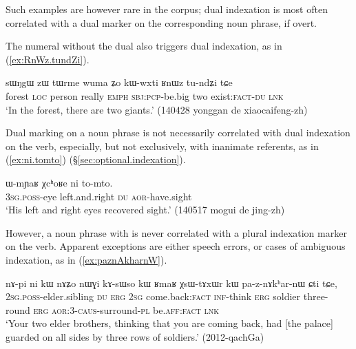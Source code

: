 Such examples are however rare in the corpus; dual indexation is most often correlated with a dual marker on the corresponding noun phrase, if overt.

The numeral  without the dual also triggers dual indexation, as in (\ref{ex:RnWz.tundZi}).

\begin{exe}
\ex \label{ex:RnWz.tundZi}
\gll   sɯŋgɯ zɯ tɯrme wuma ʑo kɯ-wxti ʁnɯz tu-ndʑi tɕe\\
forest \textsc{loc} person really \textsc{emph} \textsc{sbj}:\textsc{pcp}-be.big two exist:\textsc{fact}-\textsc{du} \textsc{lnk}\\
\glt `In the forest, there are two giants.'  (140428 yonggan de xiaocaifeng-zh)
\end{exe}

Dual marking on a noun phrase is not necessarily correlated with dual indexation on the verb, especially, but not exclusively, with inanimate referents, as in (\ref{ex:ni.tomto}) (§\ref{sec:optional.indexation}).

\begin{exe}
\ex \label{ex:ni.tomto}
\gll  ɯ-mɲaʁ χcʰoʁe ni to-mto. \\
\textsc{3sg}.\textsc{poss}-eye left.and.right \textsc{du} \textsc{aor}-have.sight \\
\glt `His left and right eyes recovered sight.' (140517 mogui de jing-zh) 
\end{exe}

However, a noun phrase with  is never correlated with a plural indexation marker on the verb. Apparent exceptions are either speech errors, or cases of ambiguous indexation, as in (\ref{ex:paznAkharnW}).

\begin{exe}
\ex \label{ex:paznAkharnW}
 \gll  nɤ-pi ni kɯ nɤʑo nɯɣi kɤ-sɯso kɯ ʁmaʁ χsɯ-tɤxɯr kɯ pa-z-nɤkʰar-nɯ ɕti tɕe, \\
 \textsc{2sg}.\textsc{poss}-elder.sibling \textsc{du} \textsc{erg} \textsc{2sg} come.back:\textsc{fact} \textsc{inf}-think \textsc{erg} soldier three-round \textsc{erg} \textsc{aor}:3\flobv{}-\textsc{caus}-surround-\textsc{pl} be.\textsc{aff}:\textsc{fact} \textsc{lnk} \\
 \glt `Your two elder brothers, thinking that you are coming back, had [the palace] guarded on all sides by three rows of soldiers.' (2012-qachGa)
\end{exe}

